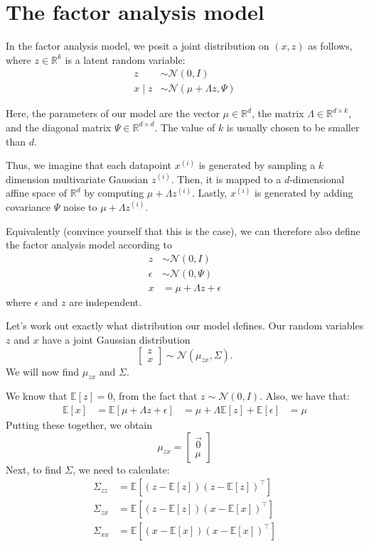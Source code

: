 \section{The factor analysis model}
In the factor analysis model, we posit a joint distribution on $(x, z)$ as follows,
where $z \in \mathbb R^k$ is a latent random variable:
\begin{align*}
    z &\sim \mathcal N (0, I)\\
    x \mid z &\sim \mathcal N (\mu + \Lambda z, \Psi)
\end{align*}

Here, the parameters of our model are the vector $\mu \in \mathbb R^d$, the matrix
$\Lambda \in \mathbb R^{d \times k}$, and the diagonal matrix $\Psi \in \mathbb R^{d \times d}$.
The value of $k$ is usually chosen to be smaller than $d$.

Thus, we imagine that each datapoint $x^{(i)}$
is generated by sampling a $k$ dimension multivariate Gaussian $z^{(i)}$. Then, it is mapped to a $d$-dimensional
affine space of $\mathbb R^d$ by computing $\mu + \Lambda z^{(i)}$. Lastly, $x^{(i)}$
is generated by adding covariance $\Psi$ noise to $\mu + \Lambda z^{(i)}$.

Equivalently (convince yourself that this is the case), we can therefore
also define the factor analysis model according to
\begin{align*}
    z &\sim \mathcal N(0, I)\\
    \epsilon &\sim \mathcal N (0, \Psi)\\
    x &= \mu + \Lambda z + \epsilon
\end{align*}
where $\epsilon$ and $z$ are independent.

Let's work out exactly what distribution our model defines. Our random
variables $z$ and $x$ have a joint Gaussian distribution
\[
\begin{bmatrix}
    z\\
    x
\end{bmatrix} \sim \mathcal N (\mu_{zx}, \Sigma).
\]
We will now find $\mu_{zx}$ and $\Sigma$.

We know that $\mathbb E[z] = 0$, from the fact that $z \sim \mathcal N (0, I)$. Also, we have
that:
\begin{align*}
    \mathbb E[x] &= \mathbb E[\mu + \Lambda z + \epsilon]
        &= \mu + \Lambda \mathbb E[z] + \mathbb E[\epsilon]
        &= \mu
\end{align*}
Putting these together, we obtain
\[
\mu_{zx} =
\begin{bmatrix}
    \vec{0}\\
    \mu    
\end{bmatrix}
\]
Next, to find $\Sigma$, we need to calculate:
\begin{align*} %
    \Sigma_{zz} &= \mathbb E[(z - \mathbb E[z])(z - \mathbb E[z])^\top] \tag{the upper-left block of $\Sigma$}\\
    \Sigma_{zx} &= \mathbb E[(z - \mathbb E[z])(x - \mathbb E[x])^\top] \tag{upper-right block}\\
    \Sigma_{xx} &= \mathbb E[(x - \mathbb E[x])(x - \mathbb E[x])^\top] \tag{lower-right block}
\end{align*}

